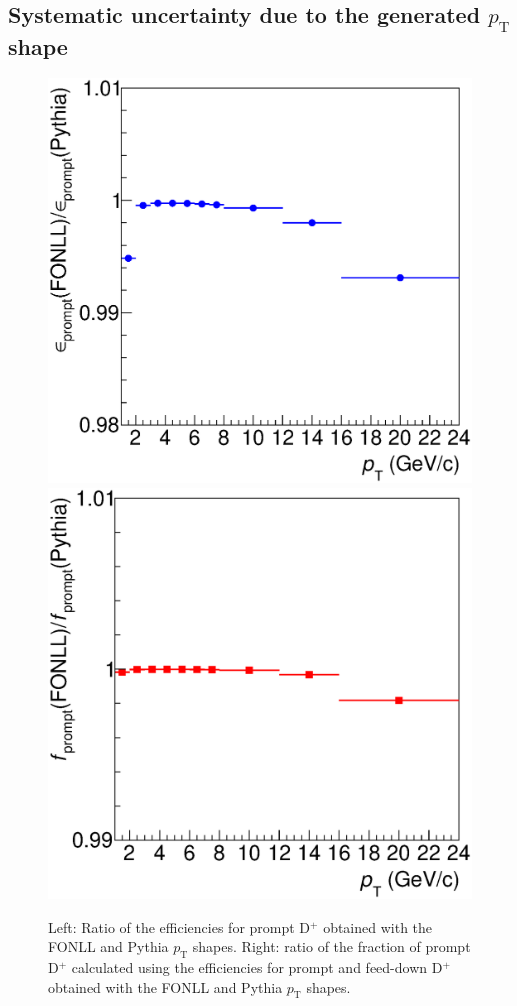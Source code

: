 \documentclass[b5paper,10pt,twoside,oldstyle,classica]{toptesi}
\newcommand{\pt}{p_\text{T}}
\begin{document}
\subsection{Systematic uncertainty due to the generated $\pt$ shape}
\begin{figure}[tb]
\begin{center}
{\includegraphics[scale = 0.31]{RatioEffPrompt_KF.eps}}
\hspace{-0.5cm}
{\includegraphics[scale = 0.31]{KF_ratio_fprompt.eps}}
\caption{Left: Ratio of the efficiencies for prompt D$^+$ obtained with the FONLL and Pythia $\pt$ shapes. Right: ratio of the fraction of prompt D$^+$ calculated using the efficiencies for prompt and feed-down D$^+$ obtained with the FONLL and Pythia $\pt$ shapes.}
\label{KF_ptshape_syst}
\end{center}
\end{figure} 
\end{document}
